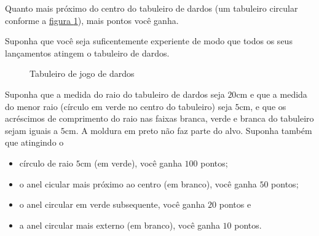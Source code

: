 \documentclass[10 pt,usenames,dvipsnames, oneside]{article}
\begin{document}
Quanto mais próximo do centro do tabuleiro de dardos (um tabuleiro circular conforme a \hyperref[dardos]{figura \ref{dardos}}), mais pontos você ganha.

Suponha que você seja suficentemente experiente de modo que todos os seus lançamentos atingem o tabuleiro de dardos.

\begin{figure}[H]
\centering


\caption{Tabuleiro de jogo de dardos}
\label{dardos}
\end{figure}

Suponha que a medida do raio do tabuleiro de dardos seja $20$cm e que a medida do menor raio (círculo em verde no centro do tabuleiro) seja $5$cm, e que os acréscimos de comprimento do raio nas faixas branca, verde e branca do tabuleiro sejam iguais a $5$cm. A moldura em preto não faz parte do alvo. Suponha também que atingindo o
\begin{itemize}
\item {} 
círculo de raio $5$cm (em verde), você ganha $100$ pontos;

\item {} 
o anel cicular mais próximo ao centro (em branco), você ganha $50$ pontos;

\item {} 
o anel circular em verde subsequente, você ganha $20$ pontos e

\item {} 
a anel circular mais externo (em branco), você ganha $10$ pontos.

\end{itemize}
\end{document}
